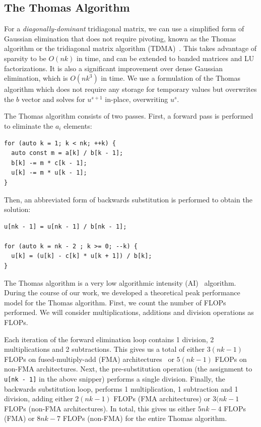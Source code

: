 \documentclass{sig-alternate-05-2015}
\begin{document}
\subsection{The Thomas Algorithm}
\label{sec:implementation:thomas_algorithm}

For a \emph{diagonally-dominant} tridiagonal matrix, we can use a simplified
  form of Gaussian elimination that does not require pivoting, known as the
  Thomas algorithm or the tridiagonal matrix algorithm
  (TDMA)~\cite{ConteEtAlElementaryNumericalAnalysis,QuarteroniEtAl2007,TDMA}. 
This takes advantage of sparsity to be \(O(nk)\) in time, 
  and can be extended to banded matrices and LU factorizations.
It is also a significant improvement over dense Gaussian elimination,
  which is \(O(nk^3)\) in time. 
We use a formulation of the Thomas algorithm which does not require any storage
  for temporary values but overwrites the \(b\) vector and solves for \(u^{s+1}\)
  in-place, overwriting \(u^{s}\).

The Thomas algorithm consists of two passes.  First, a forward pass is
  performed to eliminate the \(a_i\) elements:
\begin{lstlisting}
for (auto k = 1; k < nk; ++k) {
  auto const m = a[k] / b[k - 1];
  b[k] -= m * c[k - 1];
  u[k] -= m * u[k - 1];
} 
\end{lstlisting}
Then, an abbreviated form of backwards substitution is performed to obtain the
  solution:
\begin{lstlisting}
u[nk - 1] = u[nk - 1] / b[nk - 1];

for (auto k = nk - 2 ; k >= 0; --k) {
  u[k] = (u[k] - c[k] * u[k + 1]) / b[k];
} 
\end{lstlisting}

The Thomas algorithm is a very low algorithmic intensity (AI)~\cite{roofline}
  algorithm.
During the course of our work, we developed a theoretical peak performance
  model for the Thomas algorithm.
First, we count the number of FLOPs performed.
We will consider multiplications, additions and division operations as FLOPs.

Each iteration of the forward elimination loop contains 1 division, 2
  multiplications and 2 subtractions.
This gives us a total of either \(3(nk-1)\) FLOPs on fused-multiply-add (FMA)
  architectures~\cite{} or \(5(nk-1)\) FLOPs on non-FMA architectures.
Next, the pre-substitution operation (the assignment to \lstinline{u[nk - 1]}
  in the above snipper) performs a single division.
Finally, the backwards substitution loop, performs 1 multiplication, 1
  subtraction and 1 division, adding either \(2(nk-1)\) FLOPs (FMA architectures)
  or \(3(nk-1\) FLOPs (non-FMA architectures).
In total, this gives us either \(5nk-4\) FLOPs (FMA) or \(8nk-7\) FLOPs
  (non-FMA) for the entire Thomas algorithm.
\end{document}
